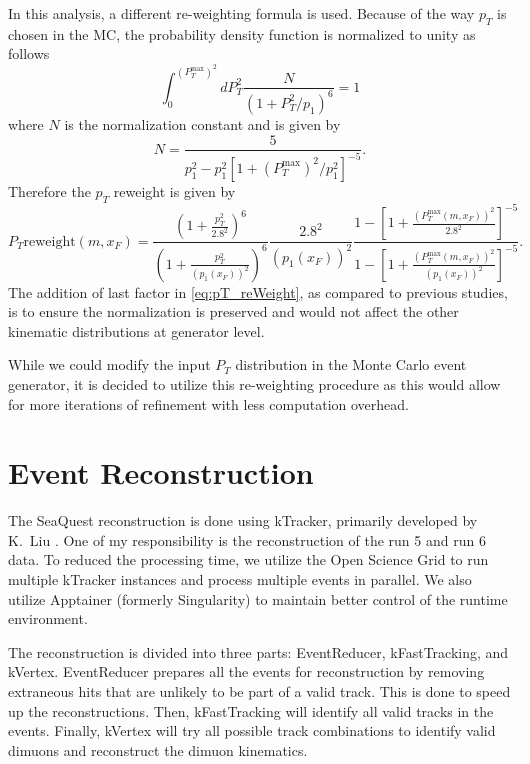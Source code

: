 \documentclass[../main.tex]{subfiles}
\begin{document}
In this analysis, a different re-weighting formula is used. Because of the way $p_T$ is chosen
in the MC, the probability density function is normalized to unity as follows
\begin{equation}
	\int^{\left(P_T^{\mathrm{max}}\right)^2}_0 dP_T^2 \frac{N}{\left(1+ P_T^2/p_1\right)^6}=1
\end{equation}
where $N$ is the normalization constant and is given by
\begin{equation}
	N=\frac{5}{p_1^2-p_1^2\left[ 1+ \left(P_T^{\mathrm{max}}\right)^2/p_1^2\right]^{-5}}.
\end{equation}
Therefore the $p_T$ reweight is given by
\begin{equation}
	P_T \mathrm{ reweight}\left(m,x_F\right)=
	\frac{\left(1 + \frac{p_T^2}{2.8^2} \right)^6}{\left(1 + \frac{p_T^2}{\left(p_1\left(x_F\right)\right)^2} \right)^6} \frac{2.8^2}{\left(p_1\left(x_F\right)\right)^2}\frac{1-\left[ 1+ \frac{\left(P_T^{\mathrm{max}}\left(m,x_F\right)\right)^2}{2.8^2}\right]^{-5}}{1-\left[ 1+ \frac{\left(P_T^{\mathrm{max}}\left(m,x_F\right)\right)^2}{\left(p_1\left(x_F\right)\right)^2}\right]^{-5}}.
	\label{eq:pT_reWeight}
\end{equation}
The addition of last factor in \cref{eq:pT_reWeight}, as compared to previous studies,
is to ensure the normalization is preserved and would not affect the other kinematic
distributions at generator level.

While we could modify the input $P_T$ distribution in the Monte Carlo event generator,
it is decided to utilize this re-weighting procedure as this would allow for
more iterations of refinement with less computation overhead.

\section{Event Reconstruction}
The SeaQuest reconstruction is done using kTracker, primarily developed by K.~Liu \cite{kTracker}.
One of my responsibility is the reconstruction of the run 5 and run 6 data. To reduced the processing
time, we utilize the Open Science Grid \cite{ruthpordes2007,sfiligoi2009,OSGPool} to run multiple kTracker
instances and process multiple events in parallel.
We also utilize Apptainer (formerly Singularity)\cite{kurtzer2021} to maintain better control of the
runtime environment.

The reconstruction is divided into three parts: EventReducer, kFastTracking, and kVertex.
EventReducer prepares all the events for reconstruction by removing extraneous hits that are
unlikely to be part of a valid track. This is done to speed up the reconstructions. Then, kFastTracking
will identify all valid tracks in the events. Finally, kVertex will try all possible track combinations
to identify valid dimuons and reconstruct the dimuon kinematics.
\end{document}
